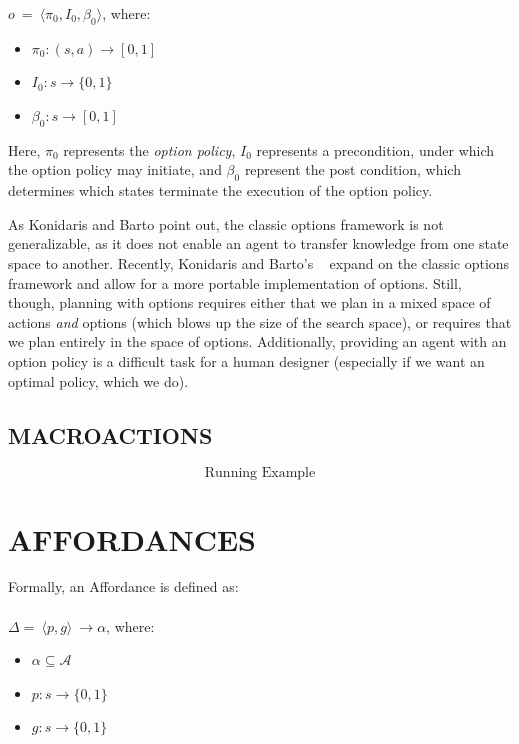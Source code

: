 \documentclass[]{article}
\begin{document}
$o\ =\ \langle \pi_0, I_0, \beta_0\rangle$, where:

\begin{itemize}
\item[] $\pi_0 : (s,a) \rightarrow [0,1]$
\item[] $I_0 : s \rightarrow \{0,1\}$
\item[] $\beta_0 : s \rightarrow [0,1]$
\end{itemize}

Here, $\pi_0$ represents the {\it option policy}, $I_0$ represents a precondition, under which the option policy may initiate, and $\beta_0$ represent the post condition, which determines which states terminate the execution of the option policy.

As Konidaris and Barto point out, the classic options framework is not 
generalizable, as it does not enable an agent to transfer knowledge from 
one state space to another. Recently, Konidaris and Barto's ~\citep{konidaris07} 
expand on the classic options framework and allow for a more portable 
implementation of options. Still, though, planning with options requires either 
that we plan in a mixed space of actions {\it and} options (which blows up the 
size of the search space), or requires that we plan entirely in the space of options. 
Additionally, providing an agent with an option policy is a difficult task for a human 
designer (especially if we want an optimal policy, which we do).

\subsection{MACROACTIONS}

\[
\boxed{\text{Running Example}}
\]

\section{AFFORDANCES}

Formally, an Affordance is defined as: \\ \\
\vspace{1 mm} $\Delta =\ \langle p,g\rangle\ \longrightarrow \alpha$, where:

\begin{itemize}
\item[] $\alpha \subseteq \mathcal{A}$
\item[] $p : s \longrightarrow \{$0$, 1\}$
\item[] $g : s \longrightarrow \{$0$,1\}$
\end{itemize}
\end{document}
